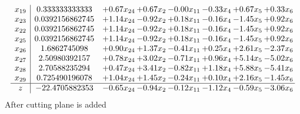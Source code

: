 \documentclass[8pt]{article}
\begin{document}
\[\begin{array}{c| c c@{\hskip 2pt} c@{\hskip 2pt} c@{\hskip 2pt} c@{\hskip 2pt} c@{\hskip 2pt} c@{\hskip 2pt} }
 x_{19}   &  0.333333333333 & +  0.67 x_{24} & +  0.67 x_{2} & -0.00 x_{11} & -0.33 x_{4} & +  0.67 x_{5} & +  0.33 x_{6}\\
 x_{23}   &  0.0392156862745 & +  1.14 x_{24} & -0.92 x_{2} & +  0.18 x_{11} & -0.16 x_{4} & -1.45 x_{5} & +  0.92 x_{6}\\
 x_{22}   &  0.0392156862745 & +  1.14 x_{24} & -0.92 x_{2} & +  0.18 x_{11} & -0.16 x_{4} & -1.45 x_{5} & +  0.92 x_{6}\\
 x_{25}   &  0.0392156862745 & +  1.14 x_{24} & -0.92 x_{2} & +  0.18 x_{11} & -0.16 x_{4} & -1.45 x_{5} & +  0.92 x_{6}\\
 x_{26}   &  1.6862745098 & +  0.90 x_{24} & +  1.37 x_{2} & -0.41 x_{11} & +  0.25 x_{4} & +  2.61 x_{5} & -2.37 x_{6}\\
 x_{27}   &  2.50980392157 & +  0.78 x_{24} & +  3.02 x_{2} & -0.71 x_{11} & +  0.96 x_{4} & +  5.14 x_{5} & -5.02 x_{6}\\
 x_{28}   &  2.70588235294 & +  0.47 x_{24} & +  3.41 x_{2} & -0.82 x_{11} & +  1.18 x_{4} & +  5.88 x_{5} & -5.41 x_{6}\\
 x_{29}   &  0.725490196078 & +  1.04 x_{24} & +  1.45 x_{2} & -0.24 x_{11} & +  0.10 x_{4} & +  2.16 x_{5} & -1.45 x_{6}\\
\hline
z    &  -22.4705882353 & -0.65 x_{24} & -0.94 x_{2} & -0.12 x_{11} & -1.12 x_{4} & -0.59 x_{5} & -3.06 x_{6}\\
\end{array}\]
 After cutting plane is added 
\end{document}

